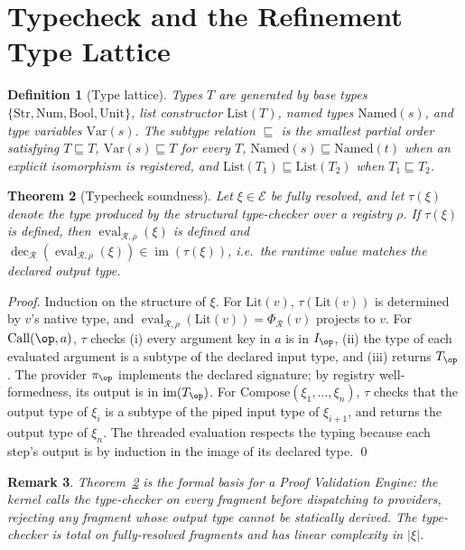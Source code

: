 \documentclass[twocolumn,a4paper]{article}
\newtheorem{theorem}{Theorem}[section]
\newtheorem{definition}[theorem]{Definition}
\newtheorem{remark}[theorem]{Remark}
\DeclareMathOperator{\img}{im}
\DeclareMathOperator{\eval}{eval}
\DeclareMathOperator{\dec}{dec}
\newcommand{\Expr}{\mathcal{E}}
\newcommand{\receiver}{\mathcal{R}}
\begin{document}
\section{Typecheck and the Refinement Type Lattice}
\label{sec:typecheck}

\begin{definition}[Type lattice]
\label{def:type-lattice}
Types $T$ are generated by base types $\{\mathrm{Str},\mathrm{Num},\mathrm{Bool},\mathrm{Unit}\}$, list constructor $\mathrm{List}(T)$, named types $\mathrm{Named}(s)$, and type variables $\mathrm{Var}(s)$. The subtype relation $\sqsubseteq$ is the smallest partial order satisfying $T\sqsubseteq T$, $\mathrm{Var}(s)\sqsubseteq T$ for every $T$, $\mathrm{Named}(s)\sqsubseteq\mathrm{Named}(t)$ when an explicit isomorphism is registered, and $\mathrm{List}(T_{1})\sqsubseteq\mathrm{List}(T_{2})$ when $T_{1}\sqsubseteq T_{2}$.
\end{definition}

\begin{theorem}[Typecheck soundness]
\label{thm:typecheck-soundness}
Let $\xi\in\Expr$ be fully resolved, and let $\tau(\xi)$ denote the type produced by the structural type-checker over a registry $\rho$. If $\tau(\xi)$ is defined, then $\eval_{\receiver,\rho}(\xi)$ is defined and $\dec_{\receiver}(\eval_{\receiver,\rho}(\xi))\in\img(\tau(\xi))$, i.e.\ the runtime value matches the declared output type.
\end{theorem}

\begin{proof}
Induction on the structure of $\xi$. For $\mathrm{Lit}(v)$, $\tau(\mathrm{Lit}(v))$ is determined by $v$'s native type, and $\eval_{\receiver,\rho}(\mathrm{Lit}(v))=\Phi_{\receiver}(v)$ projects to $v$. For $\mathrm{Call}(\op,a)$, $\tau$ checks (i) every argument key in $a$ is in $I_{\op}$, (ii) the type of each evaluated argument is a subtype of the declared input type, and (iii) returns $T_{\op}$. The provider $\pi_{\op}$ implements the declared signature; by registry well-formedness, its output is in $\img(T_{\op})$. For $\mathrm{Compose}(\xi_{1},\ldots,\xi_{n})$, $\tau$ checks that the output type of $\xi_{i}$ is a subtype of the piped input type of $\xi_{i+1}$, and returns the output type of $\xi_{n}$. The threaded evaluation respects the typing because each step's output is by induction in the image of its declared type. \qed
\end{proof}

\begin{remark}
\label{rem:typecheck-implementation}
Theorem~\ref{thm:typecheck-soundness} is the formal basis for a Proof Validation Engine: the kernel calls the type-checker on every fragment before dispatching to providers, rejecting any fragment whose output type cannot be statically derived. The type-checker is total on fully-resolved fragments and has linear complexity in $|\xi|$.
\end{remark}
\end{document}
